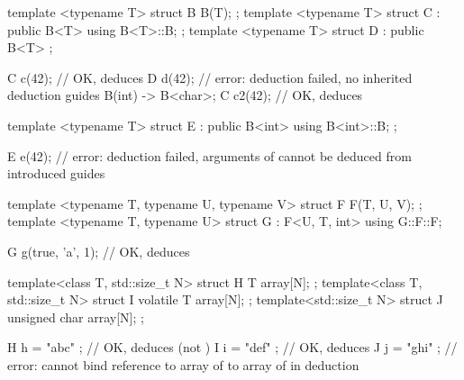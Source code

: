 \pnum
\begin{example}
\begin{codeblock}
template <typename T> struct B {
  B(T);
};
template <typename T> struct C : public B<T> {
  using B<T>::B;
};
template <typename T> struct D : public B<T> {};

C c(42);            // OK, deduces 
D d(42);            // error: deduction failed, no inherited deduction guides
B(int) -> B<char>;
C c2(42);           // OK, deduces 

template <typename T> struct E : public B<int> {
  using B<int>::B;
};

E e(42);            // error: deduction failed, arguments of  cannot be deduced from introduced guides

template <typename T, typename U, typename V> struct F {
  F(T, U, V);
};
template <typename T, typename U> struct G : F<U, T, int> {
  using G::F::F;
}

G g(true, 'a', 1);  // OK, deduces 

template<class T, std::size_t N>
struct H {
  T array[N];
};
template<class T, std::size_t N>
struct I {
  volatile T array[N];
};
template<std::size_t N>
struct J {
  unsigned char array[N];
};

H h = { "abc" };    // OK, deduces  (not )
I i = { "def" };    // OK, deduces 
J j = { "ghi" };    // error: cannot bind reference to array of  to array of  in deduction
\end{codeblock}
\end{example}

